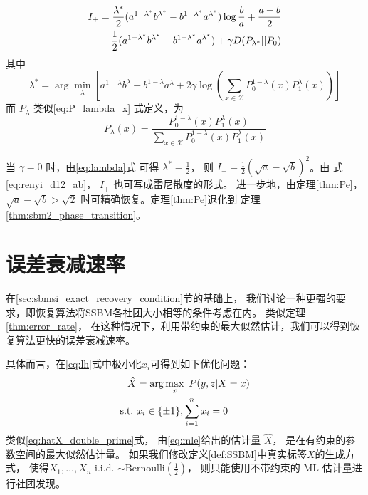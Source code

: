 \begin{lemma}\label{lem:I_plus_expression}
\begin{align}\label{equation:I+}
    I_+ &=\frac{\lambda^* }{2} (a^{1-\lambda^* }b^{\lambda^* } -
    b^{1-\lambda^* }a^{\lambda^* })\log\frac{b}{a}+\frac{a+b}{2}\notag \\
    &-\frac{1}{2}(a^{1-\lambda^*}b^{\lambda^*} +
    b^{1-\lambda^* }a^{\lambda^* })+\gamma D(P_{\lambda^* }||P_0) 
	\end{align}
	其中
	\begin{equation}\label{eq:lambda}
    \lambda^* = \arg\min_{\lambda} \left[a^{1-\lambda}b^{\lambda} +
    b^{1-\lambda}a^{\lambda} + 2\gamma \log
    \left(\sum_{x\in \mathcal{X}}P^{1-\lambda}_0(x) P^{\lambda}_1(x)
    \right)
    \right]
\end{equation}
而 $P_{\lambda}$ 类似\eqref{eq:P_lambda_x} 式定义，为
\begin{equation}\label{eq:P_lambda_0_1}
    P_{\lambda}(x) = \frac{P_0^{1-\lambda}(x) P_1^{\lambda} (x)}
    {\sum_{x \in \mathcal{X}}P_0^{1-\lambda}(x) P_1^{\lambda} (x)}        
\end{equation}

\end{lemma}



\begin{remark}
当 $\gamma=0$ 时，由\eqref{eq:lambda}式 可得 $\lambda^*=\frac{1}{2}$，
则 $I_+=\frac{1}{2}(\sqrt{a}-\sqrt{b})^2$。由 式 \eqref{eq:renyi_d12_ab}，
$I_+$ 也可写成雷尼散度的形式。
进一步地，由定理\ref{thm:Pe}，$\sqrt{a}-\sqrt{b} > \sqrt{2}$
时可精确恢复。定理\ref{thm:Pe}退化到
定理\ref{thm:sbm2_phase_transition}。
\end{remark}

\section{误差衰减速率}\label{sec:sbmsi_error_decay_rate}
在\ref{sec:sbmsi_exact_recovery_condition}节的基础上，
我们讨论一种更强的要求，即恢复算法将SSBM各社团大小相等的条件考虑在内。
类似定理\ref{thm:error_rate}，
在这种情况下，利用带约束的最大似然估计，我们可以得到恢复算法更快的误差衰减速率。

具体而言，在\eqref{eq:lh}式中极小化$x_i$可得到如下优化问题：
\begin{align}
    \hat{X} &= \arg\max_x\ P(y,z|X=x) \notag \\
    \textrm{s.t.} \ & x_i \in \{\pm 1\}, \sum_{i=1}^n x_i=0 \label{eq:mle}
\end{align}
类似\eqref{eq:hatX_double_prime}式，
由\eqref{eq:mle}给出的估计量 $\hat{X}$，
是在有约束的参数空间的最大似然估计量。
如果我们修改定义\ref{def:SSBM}中真实标签$X$的生成方式，
使得$X_1, \dots, X_n$ i.i.d. $\sim \textrm{Bernoulli}(\frac{1}{2})$，
则只能使用不带约束的 ML 估计量进行社团发现。


